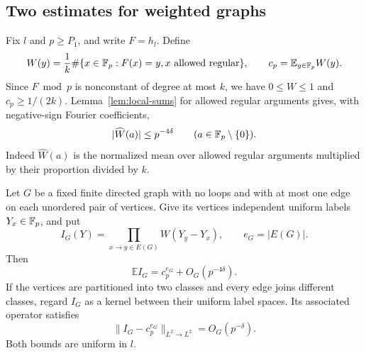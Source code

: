 \subsection{Two estimates for weighted graphs}

Fix $l$ and $p\ge P_1$, and write $F=h_l$.  Define
\begin{equation}\label{eq:tuple-edge-weight}
 W(y)=\frac1k\#\{x\in\mathbb F_p:F(x)=y, x\text{ allowed regular}\},
 \qquad c_p=\mathbb E_{y\in\mathbb F_p}W(y).
\end{equation}
Since $F\bmod p$ is nonconstant of degree at most $k$, we have
$0\le W\le1$ and $c_p\ge1/(2k)$.  Lemma~\ref{lem:local-sums}
for allowed regular arguments gives, with negative-sign Fourier
coefficients,
\begin{equation}\label{eq:tuple-edge-fourier}
 |\widehat W(a)|\le p^{-4\delta}\qquad(a\in\mathbb F_p\setminus\{0\}).
\end{equation}
Indeed $\widehat W(a)$ is the normalized mean over allowed regular
arguments multiplied by their proportion divided by $k$.

\begin{lemma}\label{lem:graph-estimates}
Let $G$ be a fixed finite directed graph with no loops and with at most one
edge on each unordered pair of vertices.  Give its vertices independent
uniform labels $Y_x\in\mathbb F_p$, and put
\[
 I_G(Y)=\prod_{x\to y\in E(G)}W(Y_y-Y_x),\qquad e_G=|E(G)|.
\]
Then
\begin{equation}\label{eq:tuple-graph-mean}
 \mathbb E I_G=c_p^{e_G}+O_G(p^{-4\delta}).
\end{equation}
If the vertices are partitioned into two classes and every edge joins
different classes, regard $I_G$ as a kernel between their uniform label
spaces.  Its associated operator satisfies
\begin{equation}\label{eq:tuple-graph-operator}
 \|I_G-c_p^{e_G}\|_{L^2\to L^2}=O_G(p^{-\delta}).
\end{equation}
Both bounds are uniform in $l$.
\end{lemma}

